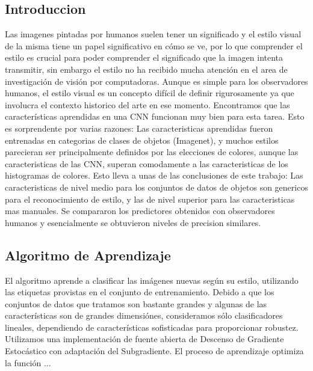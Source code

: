 \documentclass[a4paper,11pt,spanish]{book}
\begin{document}
    \subsection{Introduccion}
      Las imagenes pintadas por humanos suelen tener un significado y el estilo visual de la misma tiene un papel significativo en cómo se ve, por lo que comprender
      el estilo es crucial para poder comprender el significado que la imagen intenta transmitir, sin embargo el estilo no ha recibido  mucha atención en el area de investigación de visión por computadoras. 
      Aunque es simple para los observadores humanos, el estilo visual es un concepto difícil de definir rigurosamente ya que involucra el contexto historico del arte en ese momento.
      Encontramos que las características aprendidas en una CNN funcionan muy bien para esta tarea. Esto es sorprendente por varias razones: Las caracteristicas aprendidas
      fueron entrenadas en categorias de clases de objetos (Imagenet), y muchos estilos parecieran ser principalmente definidos por las elecciones de colores, aunque
      las caracteristicas de las CNN, superan comodamente a las caracteristicas de los histogramas de colores. Esto lleva a unas de las conclusiones de este trabajo:
      Las caracteristicas de nivel medio para los conjuntos de datos de objetos son genericos para el reconocimiento de estilo, y las de nivel superior para las caracteristicas
      mas manuales.
      Se compararon los predictores obtenidos con observadores humanos y esencialmente se obtuvieron niveles de precision similares.
    \subsection{Algoritmo de Aprendizaje}
      El algoritmo aprende a clasificar las imágenes nuevas según su estilo, utilizando las etiquetas provistas en el conjunto de entrenamiento.
      Debido a que los conjuntos de datos que tratamos son bastante grandes y algunas de las características son de grandes dimensiónes, consideramos sólo clasificadores lineales, 
      dependiendo de características sofisticadas para proporcionar robustez. Utilizamos una implementación de fuente abierta de Descenso de Gradiente Estocástico con adaptación
      del Subgradiente. El proceso de aprendizaje optimiza la función ...
\end{document}
